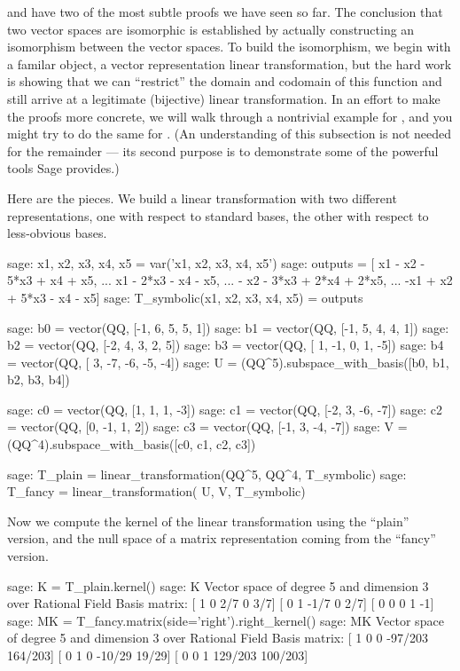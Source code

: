  and  have two of the most subtle proofs we have seen so far.  The conclusion that two vector spaces are isomorphic is established by actually constructing an isomorphism between the vector spaces.  To build the isomorphism, we begin with a familar object, a vector representation linear transformation, but the hard work is showing that we can ``restrict'' the domain and codomain of this function and still arrive at a legitimate (bijective) linear transformation.  In an effort to make the proofs more concrete, we will walk through a nontrivial example for , and you might try to do the same for .  (An understanding of this subsection is not needed for the remainder --- its second purpose is to demonstrate some of the powerful tools Sage provides.)\par
%
Here are the pieces.  We build a linear transformation with two different representations, one with respect to standard bases, the other with respect to less-obvious bases.
%
\begin{sageexample}
sage: x1, x2, x3, x4, x5 = var('x1, x2, x3, x4, x5')
sage: outputs = [ x1 - x2 - 5*x3 +   x4 +   x5,
...               x1      - 2*x3 -   x4 -   x5,
...                  - x2 - 3*x3 + 2*x4 + 2*x5,
...              -x1 + x2 + 5*x3 -   x4 -   x5]
sage: T_symbolic(x1, x2, x3, x4, x5) = outputs

sage: b0 = vector(QQ, [-1,  6,  5,  5,  1])
sage: b1 = vector(QQ, [-1,  5,  4,  4,  1])
sage: b2 = vector(QQ, [-2,  4,  3,  2,  5])
sage: b3 = vector(QQ, [ 1, -1,  0,  1, -5])
sage: b4 = vector(QQ, [ 3, -7, -6, -5, -4])
sage: U = (QQ^5).subspace_with_basis([b0, b1, b2, b3, b4])

sage: c0 = vector(QQ, [1, 1, 1, -3])
sage: c1 = vector(QQ, [-2, 3, -6, -7])
sage: c2 = vector(QQ, [0, -1, 1, 2])
sage: c3 = vector(QQ, [-1, 3, -4, -7])
sage: V = (QQ^4).subspace_with_basis([c0, c1, c2, c3])

sage: T_plain = linear_transformation(QQ^5, QQ^4, T_symbolic)
sage: T_fancy = linear_transformation(   U,    V, T_symbolic)
\end{sageexample}
%
Now we compute the kernel of the linear transformation using the ``plain'' version, and the null space of a matrix representation coming from the ``fancy'' version.
%
\begin{sageexample}
sage: K = T_plain.kernel()
sage: K
Vector space of degree 5 and dimension 3 over Rational Field
Basis matrix:
[   1    0  2/7    0  3/7]
[   0    1 -1/7    0  2/7]
[   0    0    0    1   -1]
sage: MK = T_fancy.matrix(side='right').right_kernel()
sage: MK
Vector space of degree 5 and dimension 3 over Rational Field
Basis matrix:
[      1       0       0 -97/203 164/203]
[      0       1       0  -10/29   19/29]
[      0       0       1 129/203 100/203]
\end{sageexample}
